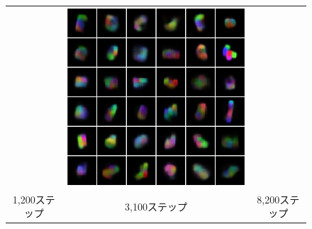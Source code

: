\begin{figure}[tbp]
\begin{center}
\begin{tabular}{ccc}
\begin{minipage}{0.33\linewidth}
\begin{center}
        \end{center}
      \end{minipage}&
      \begin{minipage}{0.33\linewidth}
        \begin{center}
          \includegraphics[width=\linewidth]{./figures/proposal8200.png}
        \end{center}
      \end{minipage} \\ 
      1,200ステップ&3,100ステップ&8,200ステップ\\


\end{tabular}
\end{center}
\end{figure}
